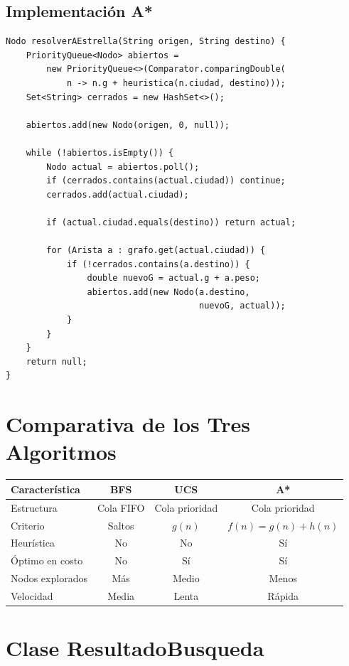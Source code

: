 \documentclass[12pt,a4paper]{article}
\begin{document}
\subsection{Implementación A*}
\begin{lstlisting}
Nodo resolverAEstrella(String origen, String destino) {
    PriorityQueue<Nodo> abiertos =
        new PriorityQueue<>(Comparator.comparingDouble(
            n -> n.g + heuristica(n.ciudad, destino)));
    Set<String> cerrados = new HashSet<>();

    abiertos.add(new Nodo(origen, 0, null));

    while (!abiertos.isEmpty()) {
        Nodo actual = abiertos.poll();
        if (cerrados.contains(actual.ciudad)) continue;
        cerrados.add(actual.ciudad);

        if (actual.ciudad.equals(destino)) return actual;

        for (Arista a : grafo.get(actual.ciudad)) {
            if (!cerrados.contains(a.destino)) {
                double nuevoG = actual.g + a.peso;
                abiertos.add(new Nodo(a.destino,
                                      nuevoG, actual));
            }
        }
    }
    return null;
}
\end{lstlisting}

\section{Comparativa de los Tres Algoritmos}

\begin{center}
\begin{tabular}{|l|c|c|c|}
\hline
\textbf{Característica} & \textbf{BFS} & \textbf{UCS} & \textbf{A*} \\
\hline
Estructura & Cola FIFO & Cola prioridad & Cola prioridad \\
Criterio & Saltos & $g(n)$ & $f(n)=g(n)+h(n)$ \\
Heurística & No & No & Sí \\
Óptimo en costo & No & Sí & Sí \\
Nodos explorados & Más & Medio & Menos \\
Velocidad & Media & Lenta & Rápida \\
\hline
\end{tabular}
\end{center}

\section{Clase ResultadoBusqueda}
\end{document}
